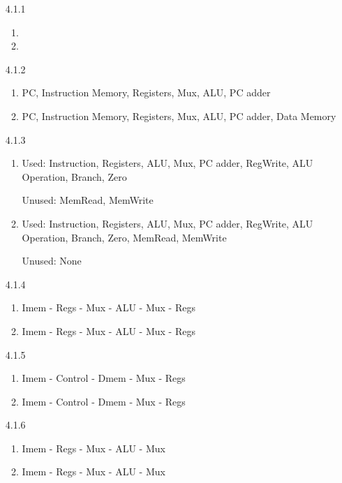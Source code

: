 \documentclass[12pt,letterpaper]{article}
\begin{document}
\begin{enumerate}
    \item[4.1.1]
        \begin{enumerate}
            \item
            \item
        \end{enumerate}
    \item[4.1.2]
        \begin{enumerate}
            \item PC, Instruction Memory, Registers, Mux, ALU, PC adder
            \item PC, Instruction Memory, Registers, Mux, ALU, PC adder, Data Memory
        \end{enumerate}
    \item[4.1.3]
        \begin{enumerate}
            \item Used: Instruction, Registers, ALU, Mux, PC adder, RegWrite, ALU Operation, Branch, Zero

                Unused: MemRead, MemWrite
            \item Used: Instruction, Registers, ALU, Mux, PC adder, RegWrite, ALU Operation, Branch, Zero, MemRead, MemWrite

                Unused: None
        \end{enumerate}
    \item[4.1.4]
        \begin{enumerate}
            \item Imem - Regs - Mux - ALU - Mux - Regs
            \item Imem - Regs - Mux - ALU - Mux - Regs
        \end{enumerate}
    \item[4.1.5]
        \begin{enumerate}
            \item Imem - Control - Dmem - Mux - Regs
            \item Imem - Control - Dmem - Mux - Regs
        \end{enumerate}
    \item[4.1.6]
        \begin{enumerate}
            \item Imem - Regs - Mux - ALU - Mux
            \item Imem - Regs - Mux - ALU - Mux
        \end{enumerate}
\end{enumerate}
\end{document}
